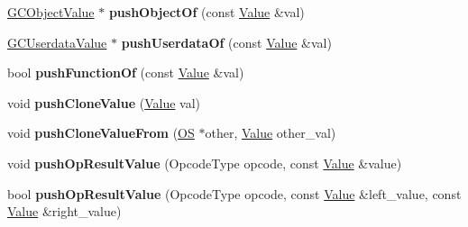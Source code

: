 \begin{DoxyCompactItemize}
\item 
\hyperlink{struct_object_script_1_1_o_s_1_1_core_1_1_g_c_object_value}{G\+C\+Object\+Value} $\ast$ {\bfseries push\+Object\+Of} (const \hyperlink{struct_object_script_1_1_o_s_1_1_core_1_1_value}{Value} \&val)\hypertarget{class_object_script_1_1_o_s_1_1_core_afe5b45cba8f6b4f85d006a00d8e47948}{}\label{class_object_script_1_1_o_s_1_1_core_afe5b45cba8f6b4f85d006a00d8e47948}

\item 
\hyperlink{struct_object_script_1_1_o_s_1_1_core_1_1_g_c_userdata_value}{G\+C\+Userdata\+Value} $\ast$ {\bfseries push\+Userdata\+Of} (const \hyperlink{struct_object_script_1_1_o_s_1_1_core_1_1_value}{Value} \&val)\hypertarget{class_object_script_1_1_o_s_1_1_core_a77eefed7166eec3f586fa283a5249681}{}\label{class_object_script_1_1_o_s_1_1_core_a77eefed7166eec3f586fa283a5249681}

\item 
bool {\bfseries push\+Function\+Of} (const \hyperlink{struct_object_script_1_1_o_s_1_1_core_1_1_value}{Value} \&val)\hypertarget{class_object_script_1_1_o_s_1_1_core_af8230d37fb720f520cdf96e06d1ab4a0}{}\label{class_object_script_1_1_o_s_1_1_core_af8230d37fb720f520cdf96e06d1ab4a0}

\item 
void {\bfseries push\+Clone\+Value} (\hyperlink{struct_object_script_1_1_o_s_1_1_core_1_1_value}{Value} val)\hypertarget{class_object_script_1_1_o_s_1_1_core_adc8d58fde4a3cd92f64da753c99339da}{}\label{class_object_script_1_1_o_s_1_1_core_adc8d58fde4a3cd92f64da753c99339da}

\item 
void {\bfseries push\+Clone\+Value\+From} (\hyperlink{class_object_script_1_1_o_s}{OS} $\ast$other, \hyperlink{struct_object_script_1_1_o_s_1_1_core_1_1_value}{Value} other\+\_\+val)\hypertarget{class_object_script_1_1_o_s_1_1_core_aa3c91d0e58b35360246fdc65a8d37192}{}\label{class_object_script_1_1_o_s_1_1_core_aa3c91d0e58b35360246fdc65a8d37192}

\item 
void {\bfseries push\+Op\+Result\+Value} (Opcode\+Type opcode, const \hyperlink{struct_object_script_1_1_o_s_1_1_core_1_1_value}{Value} \&value)\hypertarget{class_object_script_1_1_o_s_1_1_core_a2489f0c8642bcebf686a42d2b88f9f88}{}\label{class_object_script_1_1_o_s_1_1_core_a2489f0c8642bcebf686a42d2b88f9f88}

\item 
bool {\bfseries push\+Op\+Result\+Value} (Opcode\+Type opcode, const \hyperlink{struct_object_script_1_1_o_s_1_1_core_1_1_value}{Value} \&left\+\_\+value, const \hyperlink{struct_object_script_1_1_o_s_1_1_core_1_1_value}{Value} \&right\+\_\+value)\hypertarget{class_object_script_1_1_o_s_1_1_core_abe7bd4778c0391f891613953d65ea854}{}\label{class_object_script_1_1_o_s_1_1_core_abe7bd4778c0391f891613953d65ea854}


\end{DoxyCompactItemize}
